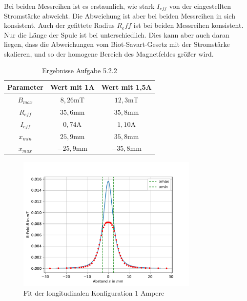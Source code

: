 \documentclass[11pt, a4paper]{article}
\begin{document}
    Bei beiden Messreihen ist es erstaunlich, wie stark $I_{eff}$ von der eingestellten Stromstärke abweicht. Die Abweichung ist aber bei beiden Messreihen in sich konsistent. Auch der gefittete Radius $R_eff$ ist bei beiden Messreihen konsistent. Nur die Länge der Spule ist bei unterschiedlich. Dies kann aber auch daran liegen, dass die Abweichungen vom Biot-Savart-Gesetz mit der Stromstärke skalieren, und so der homogene Bereich des Magnetfeldes größer wird.
    \begin{table}[h]
        \centering
        \begin{tabular}{c | c | c}
            \textbf{Parameter} & \textbf{Wert mit 1A} & \textbf{Wert mit 1,5A} \\
            \hline
            $B_{max}$ & $8,26 \si{\milli\tesla}$ & $12,3 \si{\milli\tesla}$ \\
            $R_{eff}$ & $35,6 \si{\milli\metre}$ & $35,8 \si{\milli\metre}$ \\
            $I_{eff}$ & $0,74 \si{\ampere}$ & $1,10 \si{\ampere}$ \\
            $x_{min}$ & $25,9 \si{\milli\meter}$ & $35,8 \si{\milli\meter}$ \\
            $x_{max}$ & $-25,9 \si{\milli\meter}$ & $-35,8 \si{\milli\meter}$ \\
        \end{tabular}
        \caption{Ergebnisse Aufgabe 5.2.2}
        \label{tab:fit}
    \end{table}

    \begin{figure}
        \centering
        \includegraphics[width=0.8\textwidth]{fit1.pdf}
        \caption{Fit der longitudinalen Konfiguration 1 Ampere}
        \label{fig:longfit1a}
    \end{figure}
\end{document}
